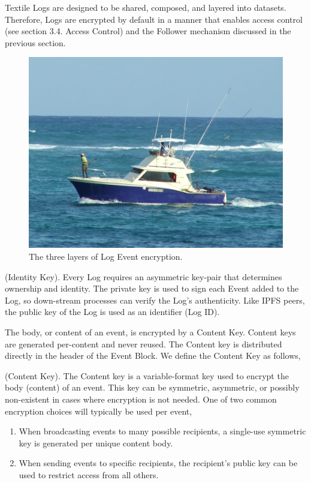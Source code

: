 \documentclass{comjnl}
\begin{document}
Textile Logs are designed to be shared, composed, and layered into datasets. Therefore, Logs are encrypted by default in a manner that enables access control (see section 3.4. Access Control) and the Follower mechanism discussed in the previous section.

\begin{figure}
  \includegraphics[width=\linewidth]{boat.jpg}
  \caption{The three layers of Log Event encryption.}
  \label{fig:boat1}
\end{figure}

\begin{definition}
(Identity Key). Every Log requires an asymmetric key-pair that determines ownership and identity. The private key is used to sign each Event added to the Log, so down-stream processes can verify the Log’s authenticity. Like IPFS peers, the public key of the Log is used as an identifier (Log ID).
\end{definition}

The body, or content of an event, is encrypted by a Content Key. Content keys are generated per-content and never reused. The Content key is distributed directly in the header of the Event Block. We define the Content Key as follows,

\begin{definition}
(Content Key). The Content key is a variable-format key used to encrypt the body (content) of an event. This key can be symmetric, asymmetric, or possibly non-existent in cases where encryption is not needed. One of two common encryption choices will typically be used per event, 
\begin{enumerate}
\item \label{Perf1}When broadcasting events to many possible recipients, a single-use symmetric key is generated per unique content body.
\item \label{Perf2}When sending events to specific recipients, the recipient's public key can be used to restrict access from all others.
\end{enumerate}
\end{definition}
\end{document}
